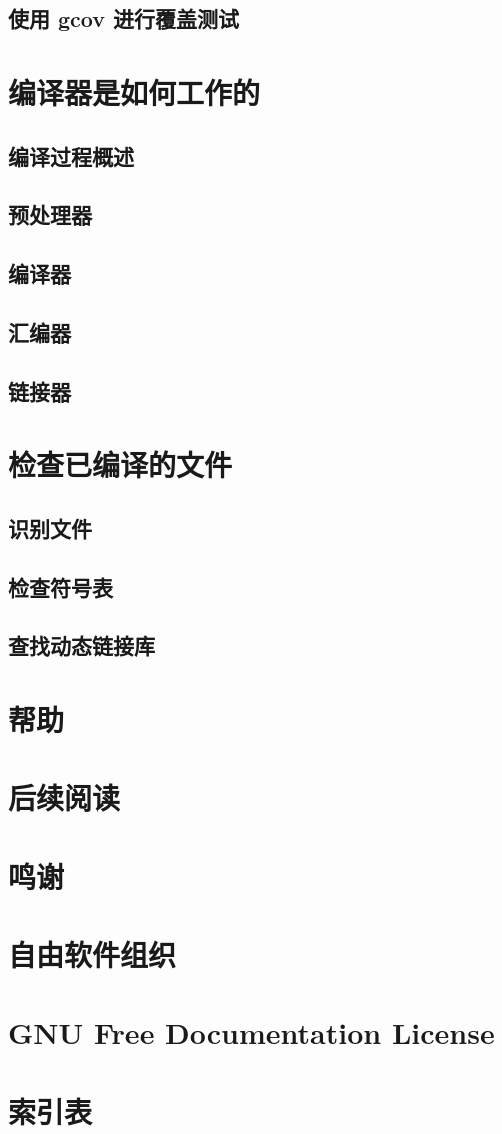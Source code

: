 \documentclass[lang=cn,10pt,newtx,scheme=chinese]{elegantbook}
\begin{document}
\section{使用 gcov 进行覆盖测试}

\chapter{编译器是如何工作的}
\section{编译过程概述}
\section{预处理器}
\section{编译器}
\section{汇编器}
\section{链接器}

\chapter{检查已编译的文件}
\section{识别文件}
\section{检查符号表}
\section{查找动态链接库}

\chapter{帮助}

\chapter*{后续阅读}
\chapter*{鸣谢}
\chapter*{自由软件组织}
\chapter*{GNU Free Documentation License}
\chapter*{索引表}
\end{document}
